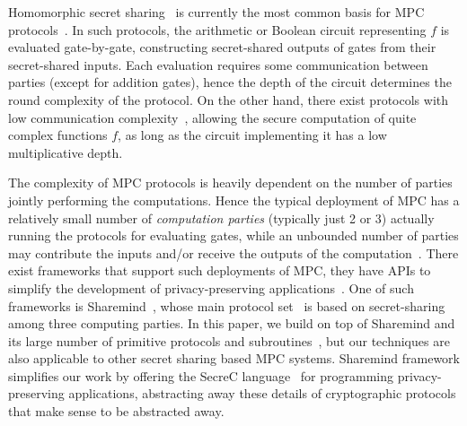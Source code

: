 Homomorphic secret sharing~\cite{blakley1979safeguarding,shamir1979share} is currently the most common basis for MPC protocols~\cite{CCD,GRR}. In such protocols, the arithmetic or Boolean circuit representing $f$ is evaluated gate-by-gate, constructing secret-shared outputs of gates from their secret-shared inputs. Each evaluation requires some communication between parties (except for addition gates), hence the depth of the circuit determines the round complexity of the protocol. On the other hand, there exist protocols with low communication complexity~\cite{DBLP:journals/ijisec/BogdanovNTW12,DBLP:conf/ccs/ArakiFLNO16,DBLP:conf/crypto/DamgardPSZ12}, allowing the secure computation of quite complex functions $f$, as long as the circuit implementing it has a low multiplicative depth.

The complexity of MPC protocols is heavily dependent on the number of parties jointly performing the computations. Hence the typical deployment of MPC has a relatively small number of \emph{computation parties} (typically just 2 or 3) actually running the protocols for evaluating gates, while an unbounded number of parties may contribute the inputs and/or receive the outputs of the computation~\cite{Kamm-thesis}. There exist frameworks that support such deployments of MPC, they have APIs to simplify the development of privacy-preserving applications~\cite{archer2018keys}. One of such frameworks is Sharemind~\cite{bogdanov2008sharemind}, whose main protocol set~\cite{DBLP:journals/ijisec/BogdanovNTW12} is based on secret-sharing among three computing parties. In this paper, we build on top of Sharemind and its large number of primitive protocols and subroutines~\cite{DBLP:conf/nordsec/BogdanovLT14}, but our techniques are also applicable to other secret sharing based MPC systems. Sharemind framework simplifies our work by offering the SecreC language~\cite{bogdanov2014domain} for programming privacy-preserving applications, abstracting away these details of cryptographic protocols that make sense to be abstracted away.

